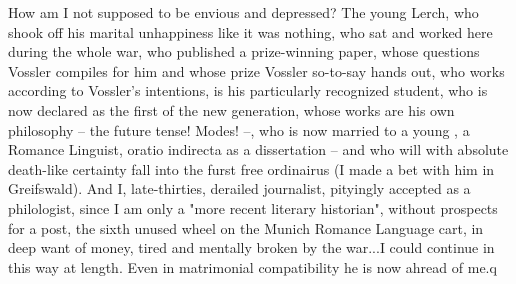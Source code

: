 
How am I not supposed to be envious and depressed? The young Lerch, who shook off his marital unhappiness like it was nothing, who sat and worked here during the whole war, who published a prize-winning paper, whose questions Vossler compiles for him and whose prize Vossler so-to-say hands out, who works according to Vossler's intentions, is his particularly recognized student, who is now declared as the first  of the new generation, whose works are his own philosophy -- the future tense! Modes! --, who is now married to a young , a Romance Linguist, oratio indirecta as a dissertation -- and who will with absolute death-like certainty fall into the furst free ordinairus (I made a bet with him in Greifswald). And I, late-thirties, derailed journalist, pityingly accepted as a philologist, since I am only a "more recent literary historian", without prospects for a post, the sixth unused wheel on the Munich Romance Language cart, in deep want of money, tired and mentally broken by the war...I could continue in this way at length. Even in matrimonial compatibility he is now ahread of me.q

%